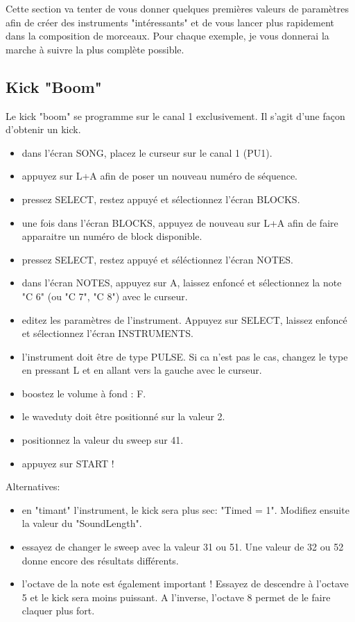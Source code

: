 Cette section va tenter de vous donner quelques premières valeurs de paramètres afin de créer des instruments "intéressants"
et de vous lancer plus rapidement dans la composition de morceaux.
Pour chaque exemple, je vous donnerai la marche à suivre la plus complète possible.

\subsection{Kick "Boom"}

Le kick "boom" se programme sur le canal 1 exclusivement. Il s'agit d'une façon d'obtenir un kick.
\medskip

\begin{itemize}
\item{dans l'écran SONG, placez le curseur sur le canal 1 (PU1).}
\item{appuyez sur L+A afin de poser un nouveau numéro de séquence.}
\item{pressez SELECT, restez appuyé et sélectionnez l'écran BLOCKS.}
\item{une fois dans l'écran BLOCKS, appuyez de nouveau sur L+A afin de faire apparaitre un numéro de block disponible.}
\item{pressez SELECT, restez appuyé et séléctionnez l'écran NOTES.}
\item{dans l'écran NOTES, appuyez sur A, laissez enfoncé et sélectionnez la note "C 6" (ou "C 7", "C 8") avec le curseur.}
\item{editez les paramètres de l'instrument. Appuyez sur SELECT, laissez enfoncé et sélectionnez l'écran INSTRUMENTS.}
\item{l'instrument doit être de type PULSE. Si ca n'est pas le cas, changez le type en pressant L et en allant vers la gauche avec le curseur.}
\item{boostez le volume à fond : F.}
\item{le waveduty doit être positionné sur la valeur 2.}
\item{positionnez la valeur du sweep sur 41.}
\item{appuyez sur START !}
\end{itemize}\medskip

Alternatives:
\medskip

\begin{itemize}
\item{en "timant" l'instrument, le kick sera plus sec: "Timed = 1". Modifiez ensuite la valeur du "SoundLength".}
\item{essayez de changer le sweep avec la valeur 31 ou 51. Une valeur de 32 ou 52 donne encore des résultats différents.}
\item{l'octave de la note est également important ! Essayez de descendre à l'octave 5 et le kick sera moins puissant. A l'inverse, l'octave 8 permet de le faire claquer plus fort.}
\end{itemize}\medskip


